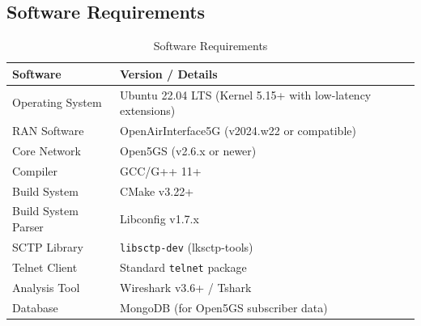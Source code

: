 \subsection{Software Requirements}
\begin{table}[H]
\centering
\begin{tabular}{|l|p{10cm}|}
\hline
\textbf{Software} & \textbf{Version / Details} \\ \hline
Operating System & Ubuntu 22.04 LTS (Kernel 5.15+ with low-latency extensions) \\ \hline
RAN Software & OpenAirInterface5G (v2024.w22 or compatible) \\ \hline
Core Network & Open5GS (v2.6.x or newer) \\ \hline
Compiler & GCC/G++ 11+ \\ \hline
Build System & CMake v3.22+ \\ \hline
Build System Parser & Libconfig v1.7.x \\ \hline
SCTP Library & \texttt{libsctp-dev} (lksctp-tools) \\ \hline
Telnet Client & Standard \texttt{telnet} package \\ \hline
Analysis Tool & Wireshark v3.6+ / Tshark \\ \hline
Database & MongoDB (for Open5GS subscriber data) \\ \hline
\end{tabular}
\caption{Software Requirements}
\end{table}

